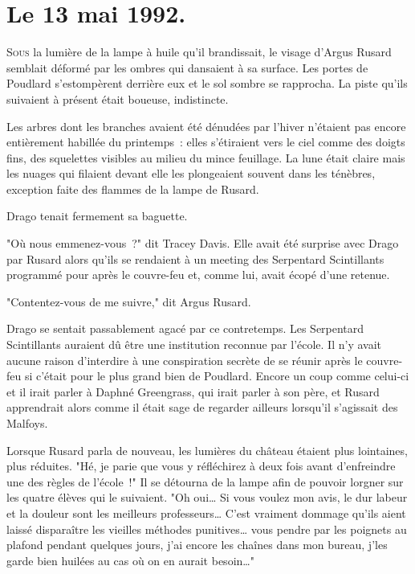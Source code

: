 
\section{Le 13 mai 1992.}

\lettrine{S}{ous} la lumière de la lampe à huile qu'il brandissait, le visage d'Argus Rusard semblait déformé par les ombres qui dansaient à sa surface. Les portes de Poudlard s'estompèrent derrière eux et le sol sombre se rapprocha. La piste qu'ils suivaient à présent était boueuse, indistincte.

Les arbres dont les branches avaient été dénudées par l'hiver n'étaient pas encore entièrement habillée du printemps~: elles s'étiraient vers le ciel comme des doigts fins, des squelettes visibles au milieu du mince feuillage. La lune était claire mais les nuages qui filaient devant elle les plongeaient souvent dans les ténèbres, exception faite des flammes de la lampe de Rusard.

Drago tenait fermement sa baguette.

"Où nous emmenez-vous~?" dit Tracey Davis. Elle avait été surprise avec Drago par Rusard alors qu'ils se rendaient à un meeting des Serpentard Scintillants programmé pour après le couvre-feu et, comme lui, avait écopé d'une retenue.

"Contentez-vous de me suivre," dit Argus Rusard.

Drago se sentait passablement agacé par ce contretemps. Les Serpentard Scintillants auraient dû être une institution reconnue par l'école. Il n'y avait aucune raison d'interdire à une conspiration secrète de se réunir après le couvre-feu si c'était pour le plus grand bien de Poudlard. Encore un coup comme celui-ci et il irait parler à Daphné Greengrass, qui irait parler à son père, et Rusard apprendrait alors comme il était sage de regarder ailleurs lorsqu'il s'agissait des Malfoys.

Lorsque Rusard parla de nouveau, les lumières du château étaient plus lointaines, plus réduites. "Hé, je parie que vous y réfléchirez à deux fois avant d'enfreindre une des règles de l'école~!" Il se détourna de la lampe afin de pouvoir lorgner sur les quatre élèves qui le suivaient. "Oh oui… Si vous voulez mon avis, le dur labeur et la douleur sont les meilleurs professeurs… C'est vraiment dommage qu'ils aient laissé disparaître les vieilles méthodes punitives… vous pendre par les poignets au plafond pendant quelques jours, j'ai encore les chaînes dans mon bureau, j'les garde bien huilées au cas où on en aurait besoin…"

